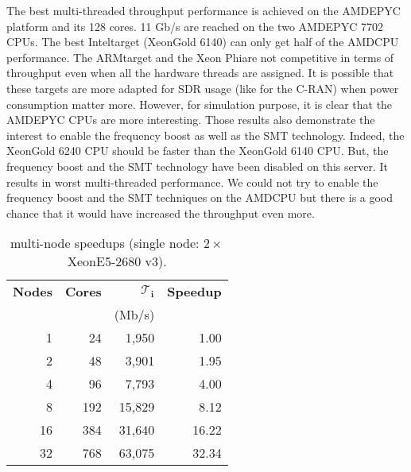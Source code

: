 The best multi-threaded throughput performance is achieved on the AMD\R EPYC
platform and its 128 cores. 11 Gb/s are reached on the two AMD\R EPYC 7702 CPUs.
The best Intel\R target (Xeon\TM Gold 6140) can only get half of the AMD\R CPU
performance. The ARM\R target and the Xeon Phi\TM are not competitive in terms
of throughput even when all the hardware threads are assigned. It is possible
that these targets are more adapted for SDR usage (like for the C-RAN) when
power consumption matter more. However, for simulation purpose, it is clear that
the AMD\R EPYC CPUs are more interesting. Those results also demonstrate the
interest to enable the frequency boost as well as the SMT technology. Indeed,
the Xeon\TM Gold 6240 CPU should be faster than the Xeon\TM Gold 6140 CPU. But,
the frequency boost and the SMT technology have been disabled on this server. It
results in worst multi-threaded performance. We could not try to enable the
frequency boost and the SMT techniques on the AMD\R CPU but there is a good
chance that it would have increased the throughput even more.

\begin{table}[htp]
  \centering
  \caption{\AFFECT multi-node speedups (single node: $2\times$Xeon\TM E5-2680 v3).}
  \label{tab:eval_simu_speedup_mpi}
  \begin{tabular}{r  r  r  r}
  \textbf{Nodes} & \textbf{Cores} & $\bm{\mathcal{T}_i}$ & \textbf{Speedup} \\
                 &                & (Mb/s)               &                  \\
  \hline
  \hline
   1             &  24            &  1,950               &  1.00            \\
   2             &  48            &  3,901               &  1.95            \\
   4             &  96            &  7,793               &  4.00            \\
   8             & 192            & 15,829               &  8.12            \\
  16             & 384            & 31,640               & 16.22            \\
  32             & 768            & 63,075               & 32.34            \\
  \end{tabular}
\end{table}

